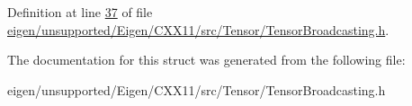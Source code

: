 Definition at line \hyperlink{eigen_2unsupported_2_eigen_2_c_x_x11_2src_2_tensor_2_tensor_broadcasting_8h_source_l00037}{37} of file \hyperlink{eigen_2unsupported_2_eigen_2_c_x_x11_2src_2_tensor_2_tensor_broadcasting_8h_source}{eigen/unsupported/\+Eigen/\+C\+X\+X11/src/\+Tensor/\+Tensor\+Broadcasting.\+h}.



The documentation for this struct was generated from the following file\+:\begin{DoxyCompactItemize}
\item 
eigen/unsupported/\+Eigen/\+C\+X\+X11/src/\+Tensor/\+Tensor\+Broadcasting.\+h\end{DoxyCompactItemize}
